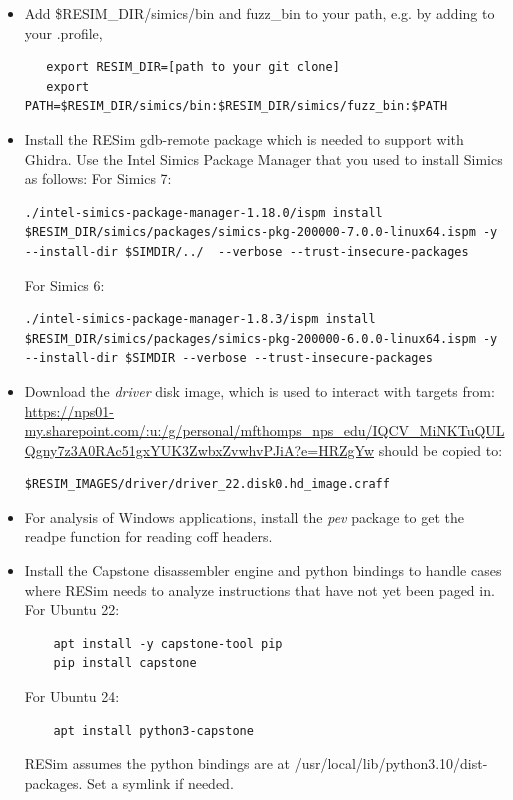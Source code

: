 \documentclass[titlepage]{article}
\begin{document}
\begin{itemize}
\begin{itemize}
\end{itemize}
\item Add \$RESIM\_DIR/simics/bin and fuzz\_bin to your path, e.g. by adding to your .profile,
\begin{verbatim}
   export RESIM_DIR=[path to your git clone]
   export PATH=$RESIM_DIR/simics/bin:$RESIM_DIR/simics/fuzz_bin:$PATH
\end{verbatim}

\item Install the RESim gdb-remote package which is needed to support with Ghidra.
Use the Intel Simics Package Manager that you used to install Simics as follows:
For Simics 7:
\begin{verbatim}
./intel-simics-package-manager-1.18.0/ispm install $RESIM_DIR/simics/packages/simics-pkg-200000-7.0.0-linux64.ispm -y --install-dir $SIMDIR/../  --verbose --trust-insecure-packages
\end{verbatim}
For Simics 6:
\begin{verbatim}
./intel-simics-package-manager-1.8.3/ispm install $RESIM_DIR/simics/packages/simics-pkg-200000-6.0.0-linux64.ispm -y --install-dir $SIMDIR --verbose --trust-insecure-packages
\end{verbatim}

\item Download the \textit{driver} disk image, which is used to interact with targets from:
\url{https://nps01-my.sharepoint.com/:u:/g/personal/mfthomps\_nps\_edu/IQCV\_MiNKTuQULQgny7z3A0RAc51gxYUK3ZwbxZvwhvPJiA?e=HRZgYw}
\noindent should be copied to:
\begin{verbatim}
$RESIM_IMAGES/driver/driver_22.disk0.hd_image.craff
\end{verbatim}

\item For analysis of Windows applications, install the \textit{pev} package to get the readpe function for reading coff headers.
\item Install the Capstone disassembler engine and python bindings to handle cases where RESim needs to analyze instructions that have not yet
been paged in.   For Ubuntu 22:
\begin{verbatim}
    apt install -y capstone-tool pip
    pip install capstone
\end{verbatim}
\noindent For Ubuntu 24:
\begin{verbatim}
    apt install python3-capstone
\end{verbatim}
RESim assumes the python bindings are at /usr/local/lib/python3.10/dist-packages.  Set a symlink if needed.

\end{itemize}
\end{document}
